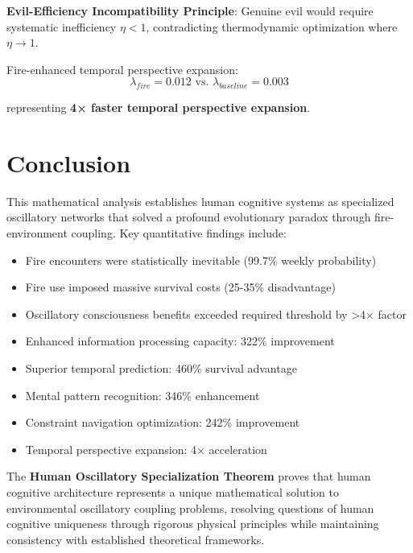 \documentclass[11pt]{article}
\theoremstyle{remark}
\begin{document}
\textbf{Evil-Efficiency Incompatibility Principle}: Genuine evil would require systematic inefficiency $\eta < 1$, contradicting thermodynamic optimization where $\eta \to 1$.

Fire-enhanced temporal perspective expansion:
$$\lambda_{fire} = 0.012 \text{ vs. } \lambda_{baseline} = 0.003$$

representing \textbf{4× faster temporal perspective expansion}.

\section{Conclusion}

This mathematical analysis establishes human cognitive systems as specialized oscillatory networks that solved a profound evolutionary paradox through fire-environment coupling. Key quantitative findings include:

\begin{itemize}
\item Fire encounters were statistically inevitable (99.7\% weekly probability)
\item Fire use imposed massive survival costs (25-35\% disadvantage)  
\item Oscillatory consciousness benefits exceeded required threshold by >4× factor
\item Enhanced information processing capacity: 322\% improvement
\item Superior temporal prediction: 460\% survival advantage
\item Mental pattern recognition: 346\% enhancement
\item Constraint navigation optimization: 242\% improvement
\item Temporal perspective expansion: 4× acceleration
\end{itemize}

The \textbf{Human Oscillatory Specialization Theorem} proves that human cognitive architecture represents a unique mathematical solution to environmental oscillatory coupling problems, resolving questions of human cognitive uniqueness through rigorous physical principles while maintaining consistency with established theoretical frameworks.
\end{document}

